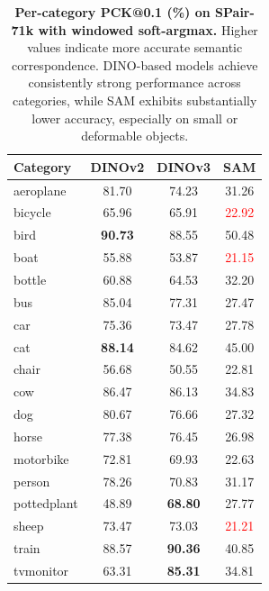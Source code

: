 \begin{table}
    \centering
    \setlength{\tabcolsep}{8pt}
    \begin{tabular}{lccc}
        \toprule
        Category & DINOv2 & DINOv3 & SAM \\
        \midrule
        aeroplane     & 81.70 & 74.23 & 31.26 \\
        bicycle       & 65.96 & 65.91 & \textcolor{red}{22.92} \\
        bird          & \textbf{90.73} & 88.55 & 50.48 \\
        boat          & 55.88 & 53.87 & \textcolor{red}{21.15} \\
        bottle        & 60.88 & 64.53 & 32.20 \\
        bus           & 85.04 & 77.31 & 27.47 \\
        car           & 75.36 & 73.47 & 27.78 \\
        cat           & \textbf{88.14} & 84.62 & 45.00 \\
        chair         & 56.68 & 50.55 & 22.81 \\
        cow           & 86.47 & 86.13 & 34.83 \\
        dog           & 80.67 & 76.66 & 27.32 \\
        horse         & 77.38 & 76.45 & 26.98 \\
        motorbike     & 72.81 & 69.93 & 22.63 \\
        person        & 78.26 & 70.83 & 31.17 \\
        pottedplant   & 48.89 & \textbf{68.80} & 27.77 \\
        sheep         & 73.47 & 73.03 & \textcolor{red}{21.21} \\
        train         & 88.57 & \textbf{90.36} & 40.85 \\
        tvmonitor     & 63.31 & \textbf{85.31} & 34.81 \\
        \bottomrule
    \end{tabular}
    \caption{
    \textbf{Per-category PCK@0.1 (\%) on SPair-71k with windowed soft-argmax.}
    Higher values indicate more accurate semantic correspondence.
    DINO-based models achieve consistently strong performance across categories,
    while SAM exhibits substantially lower accuracy, especially on small or deformable objects.
    }
    \label{tab:softargmax_category}
\end{table}



